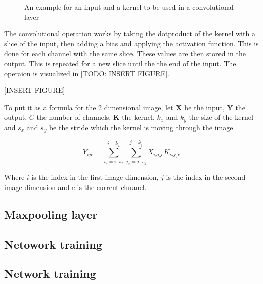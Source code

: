 \begin{figure}
    \centering
    \hfill
    \hfill
    \hfill
    \null
    \caption{An example for an input and a kernel to be used in a convolutional layer}
    \label{fig:conv_input_and_kernel}
\end{figure}


The convolutional operation works by taking the dotproduct of the kernel with a slice of the input, then adding a bias and applying the activation function. This is done for each channel with the same slice. These values are then stored in the output. This is repeated for a new slice until the the end of the input. The operaion is visualized in [TODO: INSERT FIGURE].

[INSERT FIGURE]

To put it as a formula for the 2 dimensional image, let $\bm{X}$ be the input, $\bm{Y}$ the output, $C$ the number of channels, $\bm{K}$ the kernel, $k_x$ and $k_y$ the size of the kernel and $s_x$ and $s_y$ be the stride which the kernel is moving through the image.

$$Y_{ijc} = \sum^{i + k_x}_{i_2 = i \cdot s_x} \sum^{j + k_y}_{j_2 = j \cdot s_y} X_{i_2j_2c} K_{i_2j_2c} $$

Where $i$ is the index in the first image dimension, $j$ is the index in the second image dimension and $c$ is the current chnanel.

\subsection{Maxpooling layer}

\subsection{Netowork training}



\subsection{Network training}
